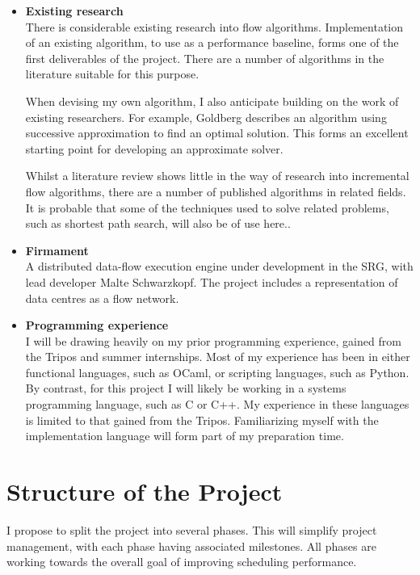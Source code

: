 \begin{itemize}
  \item \textbf{Existing research} \\
    There is considerable existing research into flow algorithms. Implementation of an existing algorithm, to use as a performance baseline, forms one of the first deliverables of the project. There are a number of algorithms in the literature suitable for this purpose\cite{Goldberg:1992,Zolt:2012}. 
    
    When devising my own algorithm, I also anticipate building on the work of existing researchers. For example, Goldberg\cite{Goldberg:1987} describes an algorithm using successive approximation to find an optimal solution. This forms an excellent starting point for developing an approximate solver.

    Whilst a literature review shows little in the way of research into incremental flow algorithms, there are a number of published algorithms in related fields. It is probable that some of the techniques used to solve related problems, such as shortest path search, will also be of use here.\cite{Ramalingam:1996,Roddity:2011}.
  \item \textbf{Firmament} \\
    A distributed data-flow execution engine under development in the SRG, with lead developer Malte Schwarzkopf. The project includes a representation of data centres as a flow network.
  \item \textbf{Programming experience} \\ 
    I will be drawing heavily on my prior programming experience, gained from the Tripos and summer internships. Most of my experience has been in either functional languages, such as OCaml, or scripting languages, such as Python. By contrast, for this project I will likely be working in a systems programming language, such as C or C++. My experience in these languages is limited to that gained from the Tripos. Familiarizing myself with the implementation language will form part of my preparation time.
\end{itemize}

\section*{Structure of the Project}

I propose to split the project into several phases. This will simplify project management, with each phase having associated milestones. All phases are working towards the overall goal of improving scheduling performance.

